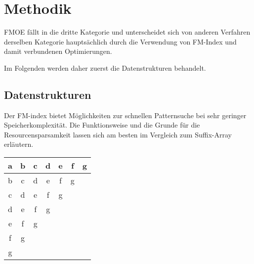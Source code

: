 \chapter{Methodik}
\label{ch:methodik}

FMOE fällt in die dritte Kategorie und unterscheidet sich von anderen Verfahren derselben Kategorie hauptsächlich durch die Verwendung von FM-Index und damit verbundenen Optimierungen.

Im Folgenden werden daher zuerst die Datenstrukturen behandelt.

\section{Datenstrukturen}
\label{sec:datenstrukturen}

Der FM-index bietet Möglichkeiten zur schnellen Patternsuche bei sehr geringer Speicherkomplexität.
Die Funktionsweise und die Grunde für die Resourcensparsamkeit lassen sich am besten im Vergleich zum Suffix-Array erläutern.

\begin{tabular}{ | c | c | c | c | c | c | c | }
        \hline
        a & b & c & d & e & f & g \\
        \hline
        b & c & d & e & f & g &   \\
        \hline
        c & d & e & f & g &   &   \\
        \hline
        d & e & f & g &   &   &   \\
        \hline
        e & f & g &   &   &   &   \\
        \hline
        f & g &   &   &   &   &   \\
        \hline
        g &   &   &   &   &   &   \\
        \hline
\end{tabular}
